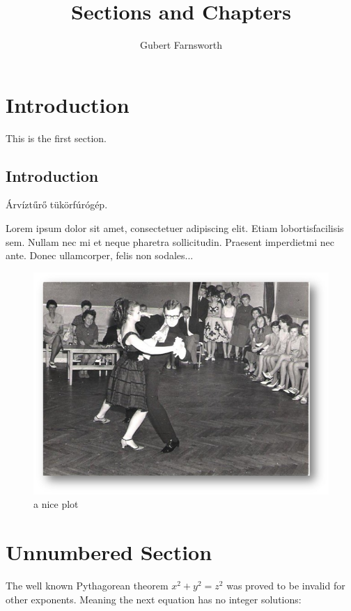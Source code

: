 \documentclass{article}
\title{Sections and Chapters}
\author{Gubert Farnsworth}
\date{ }
\begin{document}
  
\maketitle

\tableofcontents

\section{Introduction}
   
This is the first section.

\subsection{Introduction}
Árvíztűrő tükörfúrógép. 

Lorem  ipsum  dolor  sit  amet,  consectetuer  adipiscing  
elit.   Etiam  lobortisfacilisis sem.  Nullam nec mi et 
neque pharetra sollicitudin.  Praesent imperdietmi nec ante. 
Donec ullamcorper, felis non sodales...

\begin{figure}[h]
    \centering
    \includegraphics[scale=0.6]{joskabacsi}
    \caption{a nice plot}
    \label{fig:mesh1}
\end{figure}

\section*{Unnumbered Section}

The well known Pythagorean theorem \(x^2 + y^2 = z^2\) was 
proved to be invalid for other exponents. 
Meaning the next equation has no integer solutions:
\end{document}
